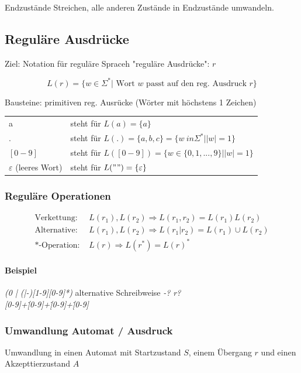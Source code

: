 Endzustände Streichen, alle anderen Zustände in Endzustände umwandeln.


\subsection{Reguläre Ausdrücke}

Ziel: Notation für reguläre Spraceh "reguläre Ausdrücke": $r$

\[
	L(r) = \{ w \in \Sigma^\ast | \text{ Wort } w \text{ passt auf den reg. Ausdruck } r\}
\]

Bausteine: primitiven reg. Ausrücke (Wörter mit höchstens 1 Zeichen)

\begin{tabular}{ l l}
	a & steht für $L(a) = \{ a \}$ \\
	. & steht für $L(.) = \{a,b,c\} = \{ w \ in \Sigma ^ \ast | |w| = 1 \}$\\
	$[0-9]$ & steht für $L([0-9])=\{w \in \{ 0, 1, ..., 9\}| |w| = 1 \}$\\
	$\varepsilon$ (leeres Wort) & steht für $L("") = \{ \varepsilon \}$
\end{tabular}

\subsubsection{Reguläre Operationen}

\begin{align*}
\text{Verkettung: } & L(r_1), L(r_2) \Rightarrow L(r_1,r_2) = L(r_1)L(r_2) \\
\text{Alternative: }& L(r_1),L(r_2) \Rightarrow L(r_1|r_2) = L(r_1) \cup L(r_2) \\
\text{*-Operation: }& L(r) \Rightarrow L(r^\ast) = L(r)^\ast
\end{align*}

\paragraph{Beispiel}

	\emph{(0 | (|-)[1-9][0-9]*)}  alternative Schreibweise \emph{-? r?} \\
	\emph{[0-9]+\.[0-9]+\.[0-9]+\.[0-9]}


\subsubsection{Umwandlung Automat / Ausdruck}
Umwandlung in einen Automat mit Startzustand $S$, einem Übergang $r$ und einen Akzepttierzustand $A$

